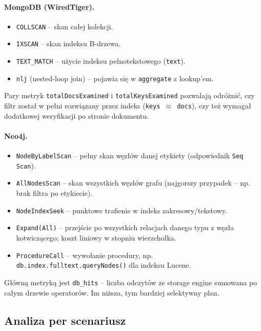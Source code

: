 \paragraph{MongoDB (WiredTiger).}
\begin{itemize}
    \item \texttt{COLLSCAN} -- skan całej kolekcji.
    \item \texttt{IXSCAN} -- skan indeksu B-drzewa.
    \item \texttt{TEXT\_MATCH} -- użycie indeksu pełnotekstowego (\texttt{text}).
    \item \texttt{nlj} (nested-loop join) -- pojawia się w
    \texttt{aggregate} z lookup'em.
\end{itemize}
\noindent Pary metryk \texttt{totalDocsExamined} i \texttt{totalKeysExamined}
pozwalają odróżnić, czy filtr został w pełni rozwiązany przez indeks
(\texttt{keys $\approx$ docs}), czy też wymagał dodatkowej weryfikacji
po stronie dokumentu.

\paragraph{Neo4j.}
\begin{itemize}
    \item \texttt{NodeByLabelScan} -- pełny skan węzłów danej etykiety
    (odpowiednik \texttt{Seq Scan}).
    \item \texttt{AllNodesScan} -- skan wszystkich węzłów grafu
    (najgorszy przypadek -- np. brak filtra po etykiecie).
    \item \texttt{NodeIndexSeek} -- punktowe trafienie w indeks
    zakresowy/tekstowy.
    \item \texttt{Expand(All)} -- przejście po wszystkich relacjach
    danego typu z węzła kotwiczącego; koszt liniowy w stopniu wierzchołka.
    \item \texttt{ProcedureCall} -- wywołanie procedury, np.
    \texttt{db.index.fulltext.queryNodes()} dla indeksu Lucene.
\end{itemize}
\noindent Główną metryką jest \texttt{db\_hits} -- liczba odczytów
ze storage engine sumowana po całym drzewie operatorów. Im niższa,
tym bardziej selektywny plan.

\subsection{Analiza per scenariusz}

